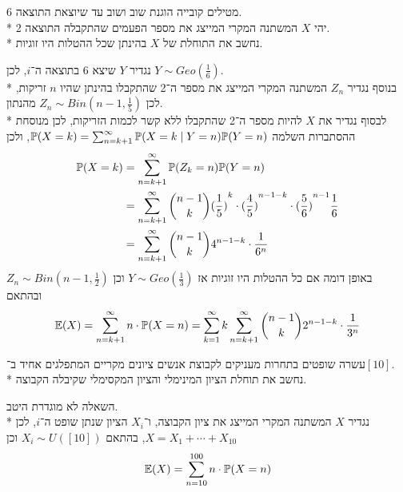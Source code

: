 \subquestion{}
מטילים קובייה הוגנת שוב ושוב עד שיוצאת התוצאה 6. \\*
יהי $X$ המשתנה המקרי המייצג את מספר הפעמים שהתקבלה התוצאה 2. \\*
נחשב את התוחלת של $X$ בהינתן שכל ההטלות היו זוגיות.
\begin{solution}
	נגדיר $Y$ שיצא 6 בתוצאה ה־$i$, לכן $Y \sim Geo(\frac{1}{6})$. \\*
	בנוסף נגדיר $Z_n$ המשתנה המקרי המייצג את מספר ה־2 שהתקבלו בהינתן שהיו $n$ זריקות, לכן $Z_n \sim Bin(n - 1, \frac{1}{5})$ מהנתון. \\*
	לבסוף נגדיר את $X$ להיות מספר ה־2 שהתקבלו ללא קשר לכמות הזריקות, לכן מנוסחת ההסתברות השלמה $\mathbb{P}(X = k) = \sum_{n = k + 1}^\infty \mathbb{P}(X = k \mid Y = n) \mathbb{P}(Y = n)$, ולכן
	\begin{align*}
		\mathbb{P}(X = k)
		& = \sum_{n = k + 1}^{\infty} \mathbb{P}(Z_k = n) \mathbb{P}(Y = n) \\
		& = \sum_{n = k + 1}^{\infty} \binom{n - 1}{k} {(\frac{1}{5})}^k \cdot {(\frac{4}{5})}^{n - 1 - k} \cdot {(\frac{5}{6})}^{n - 1} \frac{1}{6} \\
		& = \sum_{n = k + 1}^{\infty} \binom{n - 1}{k} 4^{n - 1 - k} \cdot \frac{1}{6^n}
	\end{align*}
	באופן דומה אם כל ההטלות היו זוגיות אז $Y \sim Geo(\frac{1}{3})$ וכן $Z_n \sim Bin(n - 1, \frac{1}{2})$ ובהתאם
	\[
		\mathbb{E}(X)
		= \sum_{n = k + 1}^{\infty} n \cdot \mathbb{P}(X = n)
		= \sum_{k = 1}^{\infty} k \sum_{n = k + 1}^{\infty} \binom{n - 1}{k} 2^{n - 1 - k} \cdot \frac{1}{3^n}
	\]
\end{solution}

\subquestion{}
עשרה שופטים בתחרות מעניקים לקבוצת אנשים ציונים מקריים המתפלגים אחיד ב־$[10]$. \\*
נחשב את תוחלת הציון המינימלי והציון המקסימלי שקיבלה הקבוצה.
\begin{solution}
	השאלה לא מוגדרת היטב. \\*
	נגדיר $X$ המשתנה המקרי המייצג את ציון הקבוצה, ו־$X_i$ הציון שנתן שופט ה־$i$, לכן $X = X_1 + \cdots + X_{10}$, בהתאם $X_i \sim U([10])$ וכן
	\[
		\mathbb{E}(X) = \sum_{n = 10}^{100} n \cdot \mathbb{P}(X = n)
	\]
\end{solution}

